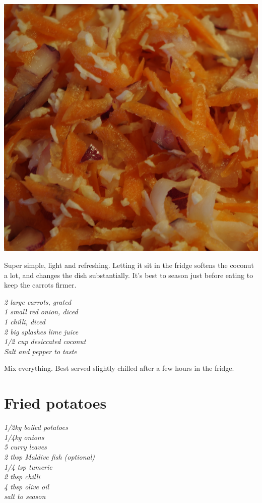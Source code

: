 \documentclass{tufte-book}
\begin{document}
\begin{marginfigure}%
  \includegraphics[width=\linewidth]{carrotraita.png}
\end{marginfigure}

Super simple, light and refreshing. Letting it sit in the fridge softens the coconut a lot, and changes the dish substantially. It's best to season just before eating to keep the carrots firmer.

\smallskip
\emph{2 large carrots, grated
\\1 small red onion, diced
\\1 chilli, diced
\\2 big splashes lime juice
\\1/2 cup desiccated coconut
\\Salt and pepper to taste}

\smallskip
Mix everything. Best served slightly chilled after a few hours in the fridge.



\section{Fried potatoes}
\emph{1/2kg boiled potatoes
\\1/4kg onions
\\5 curry leaves
\\2 tbsp Maldive fish (optional)
\\1/4 tsp tumeric
\\2 tbsp chilli
\\4 tbsp olive oil
\\salt to season
}
\end{document}
